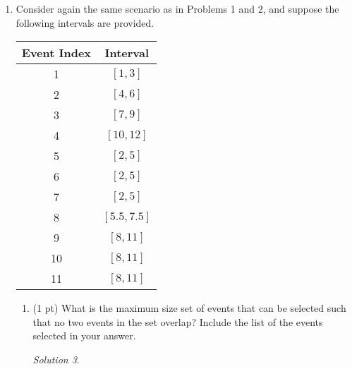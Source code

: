 \documentclass[12pt]{article}
\theoremstyle{remark}
\newtheorem*{solution}{Solution}
\begin{document}
\begin{enumerate}
\begin{enumerate}[label=(\alph*)]
\item (1 pt) What is the maximum size set of events that can be selected such that no two events in the set overlap? Include the list of the events selected in your answer.
\begin{solution}

\end{solution}

\newpage
\item (2 pt) Suppose we sort the intervals in ascending order by interval length. For events with the same length, order by start time. Consider a greedy algorithm that selects the next interval based on the smallest interval length, so long as the interval selected does not conflict with any previously selected interval. Using the intervals provided, show that this greedy algorithm fails to provide a maximum size set of events, where no two events in the set overlap. That is, the solution returned by this greedy algorithm is not optimal.

\begin{solution}

\end{solution}

\end{enumerate}

\newpage
\item Consider again the same scenario as in Problems 1 and 2, and suppose the following intervals are provided.
\begin{center}
\begin{tabular}{c|c}
Event Index & Interval \\ \hline
1 & $[1, 3]$ \\ 
2 & $[4, 6]$ \\
3 & $[7, 9]$ \\
4 & $[10, 12]$ \\
5 & $[2, 5]$ \\
6 & $[2, 5]$ \\
7 & $[2, 5]$ \\
8 & $[5.5, 7.5]$ \\
9 & $[8, 11]$ \\
10 & $[8, 11]$ \\
11 & $[8, 11]$ \\
\end{tabular}
\end{center}

\begin{enumerate}[label=(\alph*)]
\item  (1 pt) What is the maximum size set of events that can be selected such that no two events in the set overlap? Include the list of the events selected in your answer.
\begin{solution}


\end{solution}
\end{enumerate}
\end{enumerate}
\end{document}
